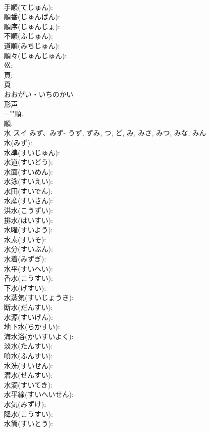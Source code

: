 \documentclass[8pt]{extreport}
\begin{document}
\begin{CJK}{UTF8}{min}
\\	手順(てじゅん): 
\\	順番(じゅんばん): 
\\	順序(じゅんじょ): 
\\	不順(ふじゅん): 
\\	道順(みちじゅん): 
\\	順々(じゅんじゅん): 
\\	巛: 
\\	頁: 
\\	頁	
\\	おおがい・いちのかい	
\\	形声 
\\	=""順.
\\	順.
\\	水	スイ	みず、みず-	うず, ずみ, つ, ど, み, みさ, みつ, みな, みん	
\\	水(みず): 
\\	水準(すいじゅん): 
\\	水道(すいどう): 
\\	水面(すいめん): 
\\	水泳(すいえい): 
\\	水田(すいでん): 
\\	水産(すいさん): 
\\	洪水(こうずい): 
\\	排水(はいすい): 
\\	水曜(すいよう): 
\\	水素(すいそ): 
\\	水分(すいぶん): 
\\	水着(みずぎ): 
\\	水平(すいへい): 
\\	香水(こうすい): 
\\	下水(げすい): 
\\	水蒸気(すいじょうき): 
\\	断水(だんすい): 
\\	水源(すいげん): 
\\	地下水(ちかすい): 
\\	海水浴(かいすいよく): 
\\	淡水(たんすい): 
\\	噴水(ふんすい): 
\\	水洗(すいせん): 
\\	潜水(せんすい): 
\\	水滴(すいてき): 
\\	水平線(すいへいせん): 
\\	水気(みずけ): 
\\	降水(こうすい): 
\\	水筒(すいとう): 

\end{CJK}
\end{document}
